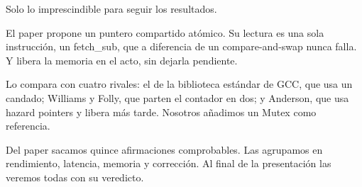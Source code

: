 Solo lo imprescindible para seguir los resultados.

El paper propone un puntero compartido atómico. Su lectura es una sola instrucción, un fetch\_sub, que a diferencia de un compare-and-swap nunca falla. Y libera la memoria en el acto, sin dejarla pendiente.

Lo compara con cuatro rivales: el de la biblioteca estándar de GCC, que usa un candado; Williams y Folly, que parten el contador en dos; y Anderson, que usa hazard pointers y libera más tarde. Nosotros añadimos un Mutex como referencia.

Del paper sacamos quince afirmaciones comprobables. Las agrupamos en rendimiento, latencia, memoria y corrección. Al final de la presentación las veremos todas con su veredicto.
